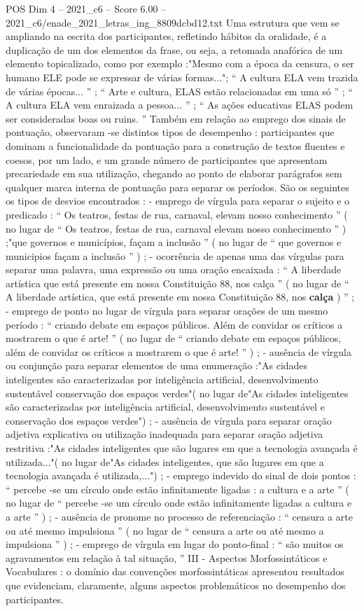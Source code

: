\begin{textsample}{POS Dim 4 – 2021\_c6 – Score 6.00 – 2021\_c6/enade\_2021\_letras\_ing\_8809dcbd12.txt}
Uma estrutura que vem se ampliando na escrita dos participantes, refletindo hábitos da oralidade, é a duplicação de um dos elementos da frase, ou seja, a retomada anafórica de um elemento topicalizado, como por exemplo :"Mesmo com a época da censura, o ser humano ELE pode se expressar de várias formas..."; “ A cultura ELA vem trazida de várias épocas... ” ; “ Arte e cultura, ELAS estão relacionadas em uma só ” ; “ A cultura ELA vem enraizada a pessoa... ” ; “ As ações educativas ELAS podem ser consideradas boas ou ruins. ” Também em relação ao emprego dos sinais de pontuação, observaram -se distintos tipos de desempenho : participantes que dominam a funcionalidade da pontuação para a construção de textos fluentes e coesos, por um lado, e um grande número de participantes que apresentam precariedade em sua utilização, chegando ao ponto de elaborar parágrafos sem qualquer marca interna de pontuação para separar os períodos.
São os seguintes os tipos de desvios encontrados : - emprego de vírgula para separar o sujeito e o predicado : “ Os teatros, festas de rua, carnaval, elevam nosso conhecimento ” ( no lugar de “ Os teatros, festas de rua, carnaval elevam nosso conhecimento ” ) ;"que governos e municípios, façam a inclusão ” ( no lugar de “ que governos e municipios façam a inclusão ” ) ; - ocorrência de apenas uma das vírgulas para separar uma palavra, uma expressão ou uma oração encaixada : “ A liberdade artística que está presente em nossa Constituição 88, nos calça ” ( no lugar de “ A liberdade artística, que está presente em nossa Constituição 88, nos \textbf{calça} ) ” ; - emprego de ponto no lugar de vírgula para separar orações de um mesmo período : “ criando debate em espaços públicos.
Além de convidar os críticos a mostrarem o que é arte! ” ( no lugar de “ criando debate em espaços públicos, além de convidar os críticos a mostrarem o que é arte! ” ) ; - ausência de vírgula ou conjunção para separar elementos de uma enumeração :"As cidades inteligentes são caracterizadas por inteligência artificial, desenvolvimento sustentável conservação dos espaços verdes"( no lugar de"As cidades inteligentes são caracterizadas por inteligência artificial, desenvolvimento sustentável e conservação dos espaços verdes") ; - ausência de vírgula para separar oração adjetiva explicativa ou utilização inadequada para separar oração adjetiva restritiva :"As cidades inteligentes que são lugares em que a tecnologia avançada é utilizada..."( no lugar de"As cidades inteligentes, que são lugares em que a tecnologia avançada é utilizada,...") ; - emprego indevido do sinal de dois pontos : “ percebe -se um círculo onde estão infinitamente ligadas : a cultura e a arte ” ( no lugar de “ percebe -se um círculo onde estão infinitamente ligadas a cultura e a arte ” ) ; - ausência de pronome no processo de referenciação : “ censura a arte ou até mesmo impulsiona ” ( no lugar de “ censura a arte ou até mesmo a impulsiona ” ) ; - emprego de vírgula em lugar do ponto-final : “ são muitos os agravamentos em relação à tal situação, ” III - Aspectos Morfossintáticos e Vocabulares : o domínio das convenções morfossintáticas apresentou resultados que evidenciam, claramente, alguns aspectos problemáticos no desempenho dos participantes.

\end{textsample}
